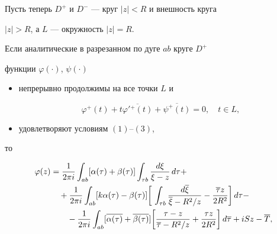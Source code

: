Пусть теперь $D^+$ и $D^-$ --- круг $|z|<R$ и внешность круга


$|z|>R$, а $L$ --- окружность $|z|=R$.





\begin{lem}


Если аналитические в разрезанном по дуге $ab$ круге $D^+$


функции $\varphi(\cdot)$, $\psi(\cdot)$


\begin{itemize}


\item[1)] непрерывно продолжимы на все точки $L$ и


\begin{equation}


\varphi^+(t)+t\overline{\varphi'{}^+(t)}+


\overline{\psi^+(t)}=0, \quad t\in L,


\end{equation}


\item[2)] удовлетворяют условиям $(1)$--$(3)$,


\end{itemize}


то


\begin{align}


\varphi(z) &= \frac{1}{2\pi i} \int_{ab} [\alpha(\tau)+\beta(\tau)]


\int_{\tau b}\frac{d\xi}{\xi-z}\,d\tau + \notag \\


%


&\quad + \frac{1}{2\pi i} \int_{ab} [k\alpha(\tau)-\beta(\tau)]


\bigg[\,


\int_{\tau b}\frac{d\overline{\xi}}{\overline{\xi}-R^2/z}


- \frac{\overline{\tau}z}{2R^2}


\bigg]\,d\tau - \notag \\


%


&\quad\quad - \frac{1}{2\pi i} \int_{ab} [\overline{\alpha(\tau)}


+\overline{\beta(\tau)}]\bigg[


\frac{\tau-z}{\overline{\tau}-R^2/z} + \frac{\tau z}{2R^2}


\bigg]\,d\overline{\tau} + iSz-\overline{T} , \\



\end{align}
\end{lem}
